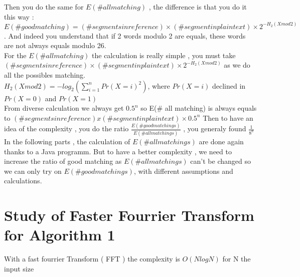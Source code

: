 \documentclass{article}
\begin{document}
Then you do the same for  $E(\# all matching)$ , the difference is that you do it this way : $E(\# good matching) = (\# segments in reference) \times (\#segment in plaintext) \times 2^{-H_{2}(X mod 2)}$ . And indeed you understand that if 2 words modulo 2 are equals, these words are not always equals modulo 26.\\
${}$\hspace{1em}For the $E(\# all matching)$ the calculation is really simple , you must take $(\# segments in reference) \times (\#segment in plaintext) \times 2^{-H_{2}(X mod 2)}$ as we do all the possibles matching.\\
$H_{2}(X mod 2) = -log_2(\sum_{i=1}^{n}{Pr(X=i)^2})$, where $Pr(X=i)$ declined in $Pr(X=0)$ and $Pr(X=1)$\\
From diverse calculation we always get $0.5^n$ so E(\# all matching) is always equals to $(\# segments in reference) x (\#segment in plaintext) \times 0.5^n$
Then to have an idea of the complexity , you do the ratio $\frac{E(\# good matchings)}{E(\# all matchings)}$ , you generaly found $\frac{1}{8^n}$\\
In the following parts , the calculation of $E(\# all matchings)$ are done again thanks to a Java programm.
But to have a better complexity , we need to increase the ratio of good matching as $E(\# all matchings)$ can't be changed so we can only try on $E(\# good matchings)$, with different assumptions and calculations.\\


\section{Study of Faster Fourrier Transform for Algorithm 1}
With a fast fourrier Transform ( FFT ) the complexity is $O(NlogN)$ for N the input size\\
\end{document}
